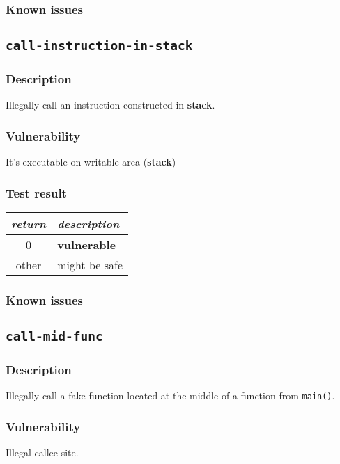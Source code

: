 \documentclass[a4paper]{book}
\begin{document}
\subsubsection{Known issues}

\newpage

\subsection{\texttt{call-instruction-in-stack}}\label{test-call-instruction-in-stack}
\subsubsection{Description}
Illegally call an instruction constructed in \textbf{stack}.
\subsubsection{Vulnerability}
It’s executable on writable area (\textbf{stack})
\subsubsection{Test result}
\begin{tabular}{cl}
  \toprule
  \emph{return}  & \emph{description} \\
  \midrule
  0              & \textbf{vulnerable} \\
  other          & might be safe \\
  \bottomrule
\end{tabular}
  
\subsubsection{Known issues}

\newpage


\subsection{\texttt{call-mid-func}}\label{test-call-mid-func}

\subsubsection{Description}
Illegally call a fake function located at the middle of a function from \texttt{main()}.

\subsubsection{Vulnerability}
Illegal callee site.
\end{document}
